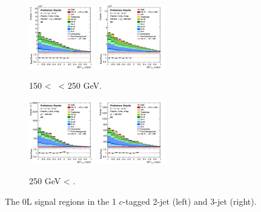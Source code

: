 \begin{figure}[h!]
    \centering
    \begin{subfigure}[b]{\textwidth}
        \centering
        \includegraphics[width=0.32\textwidth]{Images/VH/Own_fit/postfit_VHcc/Region_distmva_BMax250_BMin150_DSR_J2_TTypent_T1_L0_Y6051_GlobalFit_conditionnal_mu1.png}
        \includegraphics[width=0.32\textwidth]{Images/VH/Own_fit/postfit_VHcc/Region_distmva_BMax250_BMin150_DSR_J3_TTypent_T1_L0_Y6051_GlobalFit_conditionnal_mu1.png}
        \caption{150 < \ptv\ < 250 GeV.}
        \label{fig:plots_VHcc_OL_150_SR_1c}
    \end{subfigure}
    \begin{subfigure}[b]{\textwidth}
        \centering
        \includegraphics[width=0.32\textwidth]{Images/VH/Own_fit/postfit_VHcc/Region_distmva_BMin250_DSR_J2_TTypent_T1_L0_Y6051_GlobalFit_conditionnal_mu1.png}
        \includegraphics[width=0.32\textwidth]{Images/VH/Own_fit/postfit_VHcc/Region_distmva_BMin250_DSR_J3_TTypent_T1_L0_Y6051_GlobalFit_conditionnal_mu1.png}
        \caption{250 GeV < \ptv.}
        \label{fig:plots_VHcc_OL_250_SR_1c}
    \end{subfigure}
    \caption{The 0L signal regions in the 1 $c$-tagged 2-jet (left) and 3-jet (right).}
    \label{fig:plots_VHcc_OL_SR_1c}
\end{figure} 

